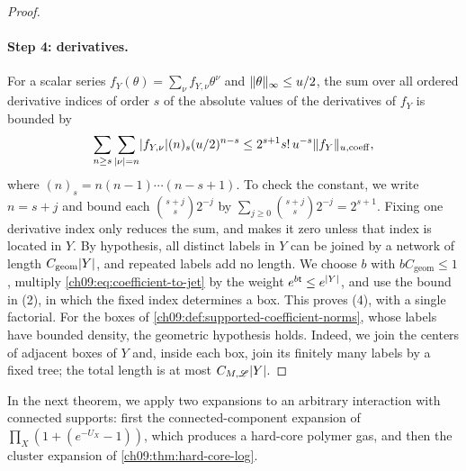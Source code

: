 \begin{proof}
\paragraph{Step 4: derivatives.}
For a scalar series $f_Y(\theta)=\sum_\nu f_{Y,\nu}\theta^\nu$ and $\lVert \theta\rVert_\infty\le u/2$, the sum over all ordered derivative indices of order $s$ of the absolute values of the derivatives of $f_Y$ is bounded by
\begin{equation}\label{ch09:eq:coefficient-to-jet}
 \sum_{n\ge s}\sum_{\lvert \nu\rvert=n}\lvert f_{Y,\nu}\rvert(n)_s(u/2)^{n-s}\le2^{s+1}s!\,u^{-s}\lVert f_Y\rVert_{u,\mathrm{coeff}},
\end{equation}
where $(n)_s=n(n-1)\cdots(n-s+1)$. To check the constant, we write $n=s+j$ and bound each $\binom{s+j}s2^{-j}$ by $\sum_{j\ge0}\binom{s+j}s2^{-j}=2^{s+1}$. Fixing one derivative index only reduces the sum, and makes it zero unless that index is located in $Y$. By hypothesis, all distinct labels in $Y$ can be joined by a network of length $C_{\mathrm{geom}}\lvert Y\rvert$, and repeated labels add no length. We choose $b$ with $bC_{\mathrm{geom}}\le1$, multiply \eqref{ch09:eq:coefficient-to-jet} by the weight $e^{b\mathsf t}\le e^{\lvert Y\rvert}$, and use the bound in (2), in which the fixed index determines a box. This proves (4), with a single factorial. For the boxes of \cref{ch09:def:supported-coefficient-norms}, whose labels have bounded density, the geometric hypothesis holds. Indeed, we join the centers of adjacent boxes of $Y$ and, inside each box, join its finitely many labels by a fixed tree; the total length is at most $C_{M,\mathscr L}\lvert Y\rvert$.
\end{proof}

In the next theorem, we apply two expansions to an arbitrary interaction with connected supports: first the connected-component expansion of $\prod_X(1+(e^{-U_X}-1))$, which produces a hard-core polymer gas, and then the cluster expansion of \cref{ch09:thm:hard-core-log}.

